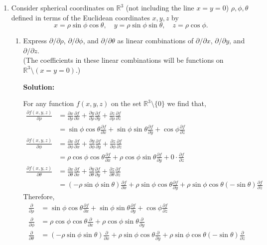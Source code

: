 \documentclass[12pt]{extarticle}
\newcommand{\R}{\mathbb{R}}
\newcommand{\pderiv}[2]{\frac{\partial{#1}}{\partial{#2}}}
\begin{document}
\begin{enumerate}
\vfill
\eject

\item Consider spherical coordinates on $\R^3$ (not including the line $x=y=0$) $\rho,\phi,\theta$ defined in terms of the Euclidean coordinates $x,y,z$ by
\[
x = \rho\sin\phi\cos\theta, \quad y = \rho\sin\phi\sin\theta, \quad z=\rho\cos\phi.
\]
\begin{enumerate}
\item
Express $\partial/\partial \rho$, $\partial/\partial\phi$, and $\partial/\partial\theta$ as linear combinations of $\partial/\partial x$, $\partial/\partial y$, and $\partial/\partial z$. \\
(The coefficients in these linear combinations will be functions on $\R^3\setminus(x=y=0)$.)

\textbf{Solution:}

For any function $f(x,y,z)$ on the set $\R^3 \setminus \{0\}$ we find that,
\begin{align*}
\pderiv{f(x,y,z)}{\rho} &= \pderiv{x}{\rho} \pderiv{f}{x} + \pderiv{y}{\rho} \pderiv{f}{y} + \pderiv{z}{\rho} \pderiv{f}{z} 
\\
&=  \sin{\phi} \cos{\theta} \pderiv{f}{x} + \sin{\phi} \sin{\theta} \pderiv{f}{y} + \cos{\phi} \pderiv{f}{z}
\\
\pderiv{f(x,y,z)}{\phi} &= \pderiv{x}{\phi} \pderiv{f}{x} + \pderiv{y}{\phi} \pderiv{f}{y} + \pderiv{z}{\phi} \pderiv{f}{z} 
\\
&= \rho \cos{\phi} \cos{\theta} \pderiv{f}{x} + \rho \cos{\phi} \sin{\theta} \pderiv{f}{y} + 0 \cdot \pderiv{f}{z}
\\
\pderiv{f(x,y,z)}{\theta} &= \pderiv{x}{\theta} \pderiv{f}{x} + \pderiv{y}{\theta} \pderiv{f}{y} + \pderiv{z}{\theta} \pderiv{f}{z} 
\\
&= (-\rho \sin{\phi} \sin{\theta}) \pderiv{f}{x} + \rho \sin{\phi} \cos {\theta}  \pderiv{f}{y} + \rho \sin{\phi} \cos{\theta} (-\sin{\theta}) \pderiv{f}{z}
\end{align*}
Therefore, 
\begin{align*}
\pderiv{}{\rho} &=  \sin{\phi} \cos{\theta} \pderiv{f}{x} + \sin{\phi} \sin{\theta} \pderiv{f}{y} + \cos{\phi} \pderiv{f}{z}
\\
\pderiv{}{\phi} &= \rho \cos{\phi} \cos{\theta} \pderiv{}{x} + \rho \cos{\phi} \sin{\theta} \pderiv{}{y}
\\
\pderiv{}{\theta} &= (-\rho \sin{\phi} \sin{\theta}) \pderiv{}{x} + \rho \sin{\phi} \cos {\theta}  \pderiv{}{y} + \rho \sin{\phi} \cos{\theta} (-\sin{\theta}) \pderiv{}{z}
\end{align*}


\end{enumerate}
\end{enumerate}
\end{document}

